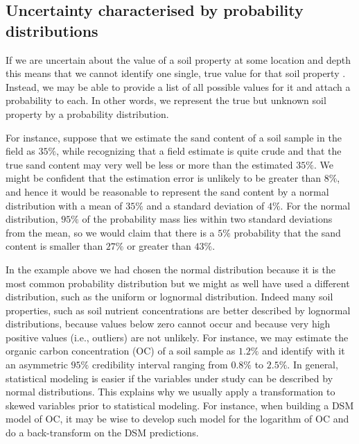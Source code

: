 \documentclass[10pt,b5paper,]{book}
\theoremstyle{definition}
\theoremstyle{definition}
\theoremstyle{definition}
\theoremstyle{remark}
\begin{document}
\hypertarget{uncertainty-characterised-by-probability-distributions}{%
\subsection{Uncertainty characterised by probability
distributions}\label{uncertainty-characterised-by-probability-distributions}}

If we are uncertain about the value of a soil property at some location
and depth this means that we cannot identify one single, true value for
that soil property
\citep{goovaerts2001geostatistical, arrouays_uncertainty_2014}. Instead,
we may be able to provide a list of all possible values for it and
attach a probability to each. In other words, we represent the true but
unknown soil property by a probability distribution.

For instance, suppose that we estimate the sand content of a soil sample
in the field as \(35\%\), while recognizing that a field estimate is
quite crude and that the true sand content may very well be less or more
than the estimated \(35\%\). We might be confident that the estimation
error is unlikely to be greater than \(8\%\), and hence it would be
reasonable to represent the sand content by a normal distribution with a
mean of \(35\%\) and a standard deviation of \(4\%\). For the normal
distribution, \(95\%\) of the probability mass lies within two standard
deviations from the mean, so we would claim that there is a \(5\%\)
probability that the sand content is smaller than \(27\%\) or greater
than \(43\%\).

In the example above we had chosen the normal distribution because it is
the most common probability distribution but we might as well have used
a different distribution, such as the uniform or lognormal distribution.
Indeed many soil properties, such as soil nutrient concentrations are
better described by lognormal distributions, because values below zero
cannot occur and because very high positive values (i.e., outliers) are
not unlikely. For instance, we may estimate the organic carbon
concentration (OC) of a soil sample as \(1.2\%\) and identify with it an
asymmetric \(95\%\) credibility interval ranging from \(0.8\%\) to
\(2.5\%\). In general, statistical modeling is easier if the variables
under study can be described by normal distributions. This explains why
we usually apply a transformation to skewed variables prior to
statistical modeling. For instance, when building a DSM model of OC, it
may be wise to develop such model for the logarithm of OC and do a
back-transform on the DSM predictions.
\end{document}
